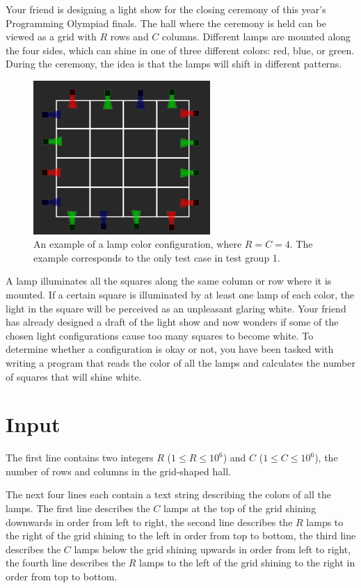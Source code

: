 \noindent
Your friend is designing a light show for the closing ceremony of this year's Programming Olympiad finals.
The hall where the ceremony is held can be viewed as a grid with $R$ rows and $C$ columns.
Different lamps are mounted along the four sides, which can shine in one of three different colors: red, blue, or green.
During the ceremony, the idea is that the lamps will shift in different patterns.

\begin{figure}[h]
    \centering
    \includegraphics[width=0.6\textwidth]{affischbild}
    \caption{An example of a lamp color configuration, where $R = C = 4$. The example corresponds to the only test case in test group 1.}
\end{figure}

A lamp illuminates all the squares along the same column or row where it is mounted.
If a certain square is illuminated by at least one lamp of each color, the light in the square will be perceived as an unpleasant glaring white.
Your friend has already designed a draft of the light show and now wonders if some of the chosen light configurations cause too many squares to become white.
To determine whether a configuration is okay or not, you have been tasked with writing a program that reads the color of all the lamps and calculates the number of squares that will shine white.

\section*{Input}
The first line contains two integers $R$ ($1 \le R \le 10^6$) and $C$ ($1 \le C \le 10^6$), the number of rows and columns in the grid-shaped hall.

The next four lines each contain a text string describing the colors of all the lamps.
The first line describes the $C$ lamps at the top of the grid shining downwards in order from left to right,
the second line describes the $R$ lamps to the right of the grid shining to the left in order from top to bottom,
the third line describes the $C$ lamps below the grid shining upwards in order from left to right,
the fourth line describes the $R$ lamps to the left of the grid shining to the right in order from top to bottom.

